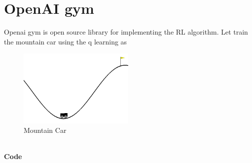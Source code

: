 \section{OpenAI gym}
Openai gym is open source library for implementing the RL algorithm.
Let train the mountain car using the q learning as
\begin{figure}
    \centering
    \includegraphics[width=0.5\textwidth]{images/mountaincar.png}
    \caption{Mountain Car}
\end{figure}
\\
\textbf{Code}
